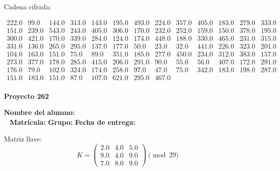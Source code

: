 \documentclass[12pt]{article}
\begin{document}
Cadena cifrada:
\begin{center}
$\begin{array}{lllllllllllll}
222.0 & 99.0 & 144.0 & 313.0 & 143.0 & 195.0 & 493.0 & 224.0 & 357.0 & 405.0 & 183.0 & 279.0 & 333.0\\
151.0 & 239.0 & 543.0 & 243.0 & 405.0 & 306.0 & 170.0 & 232.0 & 252.0 & 159.0 & 150.0 & 378.0 & 195.0\\
300.0 & 421.0 & 170.0 & 339.0 & 284.0 & 124.0 & 174.0 & 448.0 & 188.0 & 330.0 & 465.0 & 231.0 & 315.0\\
331.0 & 136.0 & 265.0 & 295.0 & 137.0 & 177.0 & 50.0 & 23.0 & 32.0 & 441.0 & 226.0 & 323.0 & 201.0\\
104.0 & 163.0 & 151.0 & 75.0 & 89.0 & 351.0 & 185.0 & 277.0 & 450.0 & 234.0 & 312.0 & 383.0 & 157.0\\
273.0 & 377.0 & 178.0 & 285.0 & 415.0 & 206.0 & 291.0 & 90.0 & 55.0 & 56.0 & 407.0 & 172.0 & 291.0\\
176.0 & 79.0 & 102.0 & 324.0 & 174.0 & 258.0 & 97.0 & 47.0 & 75.0 & 342.0 & 183.0 & 198.0 & 287.0\\
151.0 & 183.0 & 151.0 & 87.0 & 107.0 & 621.0 & 295.0 & 467.0\\
\end{array}$
\end{center}

\newpage


\textbf{Proyecto 262}

\textbf{Nombre del alumno:} \underline{\hspace{13cm}}\\\
\vspace{1cm}
\textbf{Matrícula:} \underline{\hspace{4cm}} \hspace{1cm}
\textbf{Grupo:} \underline{\hspace{2cm}}
\textbf{Fecha de entrega:} \underline{\hspace{2cm}}

\medskip

Matriz llave:
\[
K = \begin{pmatrix}
2.0 & 4.0 & 5.0\\
9.0 & 4.0 & 9.0\\
7.0 & 8.0 & 9.0
\end{pmatrix} \pmod{29}
\]
\end{document}
